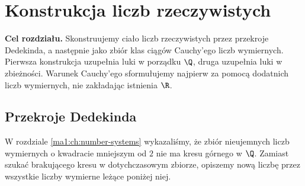 \chapter{Konstrukcja liczb rzeczywistych}
\label{ma1:ch:real-construction}
\textbf{Cel rozdziału.} Skonstruujemy ciało liczb rzeczywistych przez przekroje Dedekinda, a następnie jako zbiór klas ciągów Cauchy'ego liczb wymiernych. Pierwsza konstrukcja uzupełnia luki w porządku $\Q$, druga uzupełnia luki w zbieżności. Warunek Cauchy'ego sformułujemy najpierw za pomocą dodatnich liczb wymiernych, nie zakładając istnienia $\R$.

\section{Przekroje Dedekinda}
\label{ma1:sec:dedekind}
W rozdziale \ref{ma1:ch:number-systems} wykazaliśmy, że zbiór nieujemnych liczb wymiernych o kwadracie mniejszym od $2$ nie ma kresu górnego w $\Q$. Zamiast szukać brakującego kresu w dotychczasowym zbiorze, opiszemy nową liczbę przez wszystkie liczby wymierne leżące poniżej niej.

